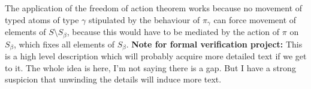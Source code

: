 The application of the freedom of action theorem works because no movement of typed atoms of type $\gamma$ stipulated by the behaviour of $\pi_\gamma$ can force
movement of elements of $S \setminus S_\beta$, because this would have to be mediated by the action of $\pi$ on $S_\beta$, which fixes all elements of $S_\beta$.
{\bf Note for formal verification project:}  This is a high level description which will probably acquire more detailed text if we get to it.  The whole idea is here, I'm not saying there is a gap.  But I have a strong suspicion that unwinding the details will induce more text.

